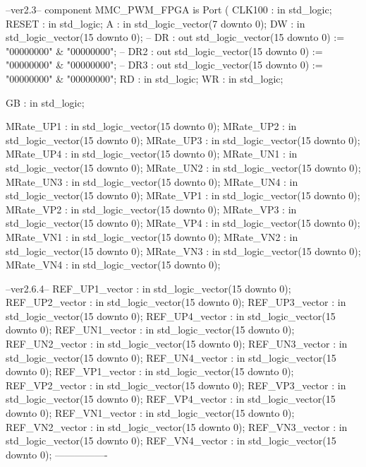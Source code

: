 \begin{mylisting}[language=VHDL,caption=トップモジュール,label=appF_Top_module_VHDL]
		--ver2.3--
	component MMC_PWM_FPGA is
		Port (
			CLK100		: in	std_logic;
			RESET		: in	std_logic;
			A			: in	std_logic_vector(7 downto 0);
			DW			: in	std_logic_vector(15 downto 0);
	--		DR			: out	std_logic_vector(15 downto 0)	:= "00000000" & "00000000";
	--		DR2		: out	std_logic_vector(15 downto 0)	:= "00000000" & "00000000";
	--		DR3		: out	std_logic_vector(15 downto 0)	:= "00000000" & "00000000";
			RD			: in	std_logic;
			WR			: in	std_logic;
			
			GB			: in  std_logic;
			
			MRate_UP1 : in std_logic_vector(15 downto 0);
			MRate_UP2 : in std_logic_vector(15 downto 0);
			MRate_UP3 : in std_logic_vector(15 downto 0);
			MRate_UP4 : in std_logic_vector(15 downto 0);
			MRate_UN1 : in std_logic_vector(15 downto 0);
			MRate_UN2 : in std_logic_vector(15 downto 0);
			MRate_UN3 : in std_logic_vector(15 downto 0);
			MRate_UN4 : in std_logic_vector(15 downto 0);
			MRate_VP1 : in std_logic_vector(15 downto 0);
			MRate_VP2 : in std_logic_vector(15 downto 0);
			MRate_VP3 : in std_logic_vector(15 downto 0);
			MRate_VP4 : in std_logic_vector(15 downto 0);
			MRate_VN1 : in std_logic_vector(15 downto 0);
			MRate_VN2 : in std_logic_vector(15 downto 0);
			MRate_VN3 : in std_logic_vector(15 downto 0);
			MRate_VN4 : in std_logic_vector(15 downto 0);
			
			--ver2.6.4--
			REF_UP1_vector	: in std_logic_vector(15 downto 0);
			REF_UP2_vector	: in std_logic_vector(15 downto 0);
			REF_UP3_vector	: in std_logic_vector(15 downto 0);
			REF_UP4_vector	: in std_logic_vector(15 downto 0);
			REF_UN1_vector	: in std_logic_vector(15 downto 0);
			REF_UN2_vector	: in std_logic_vector(15 downto 0);
			REF_UN3_vector	: in std_logic_vector(15 downto 0);
			REF_UN4_vector	: in std_logic_vector(15 downto 0);
			REF_VP1_vector	: in std_logic_vector(15 downto 0);
			REF_VP2_vector	: in std_logic_vector(15 downto 0);
			REF_VP3_vector	: in std_logic_vector(15 downto 0);
			REF_VP4_vector	: in std_logic_vector(15 downto 0);
			REF_VN1_vector	: in std_logic_vector(15 downto 0);
			REF_VN2_vector	: in std_logic_vector(15 downto 0);
			REF_VN3_vector	: in std_logic_vector(15 downto 0);
			REF_VN4_vector	: in std_logic_vector(15 downto 0);
			----------------
			

\end{mylisting}
